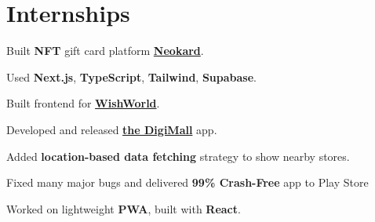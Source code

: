 \documentclass[]{deedy-resume-openfont}
\begin{document}
\begin{minipage}[t]{0.67\textwidth} 



\section{Internships}
\vspace{\topsep} %
\begin{tightemize}
\item Built \textbf{NFT} gift card platform \href{https://neokard.com/}{\textbf{Neokard}}.
\item Used \textbf{Next.js}, \textbf{TypeScript}, \textbf{Tailwind}, \textbf{Supabase}.
\item Built frontend for \href{https://wishworld.com/}{\textbf{ WishWorld}}.
\end{tightemize}
\sectionsep


\begin{tightemize}
\item Developed and released \href{https://play.google.com/store/apps/details?id=com.business.prachar}{\textbf{the DigiMall}} app.
\item Added \textbf{location-based data fetching} strategy to show nearby stores. 
\item Fixed many major bugs and delivered \textbf{99\% Crash-Free} app to Play Store
\item Worked on lightweight \textbf{PWA}, built with \textbf{React}.
\end{tightemize}
\sectionsep





\end{minipage}
\end{document}
